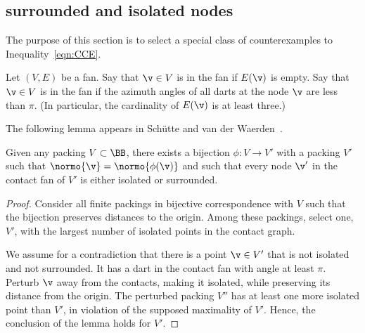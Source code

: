 \subsection{surrounded and isolated nodes}

%
The
purpose of this section is to select a special class of
counterexamples to Inequality~\ref{eqn:CCE}.

\begin{definition}
  Let $(V,E)$ be a fan.  Say that $\v\in V$ is  in
  the fan if $E(\v)$ is empty.  Say that $\v\in V$ is
   in the fan if the azimuth angles of all darts
  at the node $\v$ are less than $\pi$.  (In particular, the
  cardinality of $E(\v)$ is at least three.)
\end{definition}
%
%
%
%
%
%

The following lemma appears in Sch\"utte and van der
Waerden~\cite{vanderWaerden:1951}.

\begin{lemma*}[]
\label{lemma:iso-surround}
Given any packing $V\subset \BB$,
there exists a bijection $\phi:V\to V'$ with a  packing $V'$ 
such that $\normo{\v} = \normo{\phi(\v)}$ and
such that every node $\v'$ in the contact fan of $V'$
is either isolated or surrounded.
\end{lemma*}
%
%
%

\begin{proof} Consider all finite packings in bijective correspondence
  with $V$ such that the bijection preserves distances to
  the origin.  Among these packings, select one, $V'$, with the largest
  number of isolated points in the contact graph.  

We assume for a contradiction that  there is a point
  $\v\in V'$ that is not isolated and not surrounded.  It  has a
  dart in the contact fan with angle at least $\pi$.  Perturb $\v$ away from the
  contacts, making it isolated, while preserving its distance from
  the origin.  The perturbed packing $V''$ has at least one more isolated point
  than $V'$, in violation of the supposed maximality of $V'$.
  Hence, the conclusion of the lemma holds for $V'$.
\end{proof}

